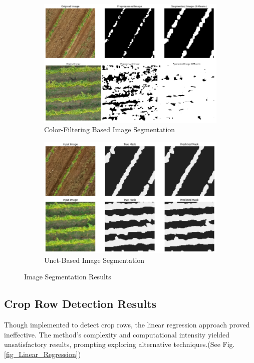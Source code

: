 \documentclass[conference]{IEEEtran}
\begin{document}
	\begin{figure}[t]
		\begin{subfigure}{\linewidth}
			\centering
			\includegraphics[width=0.7\linewidth]{kmeans_predictions.png}
			\caption{Color-Filtering Based Image Segmentation}
			\label{fig2:kmeans}
		\end{subfigure}
		
		\vspace{0.5cm}
		
		\begin{subfigure}{\linewidth}
			\centering
			\includegraphics[width=0.7\linewidth]{unet_predictions.png}
			\caption{Unet-Based Image Segmentation}
			\label{fig2:Unet_Segmentation}
		\end{subfigure}
		
		\caption{Image Segmentation Results \cite{b5}}
		\label{fig:Image_Segmentation_Results}
	\end{figure}
	
	\subsection{Crop Row Detection Results}
	
	Though implemented to detect crop rows, the linear regression approach proved ineffective. The method's complexity and computational intensity yielded unsatisfactory results, prompting exploring alternative techniques.(See Fig.\ref{fig_Linear_Regression})
	
\end{document}
